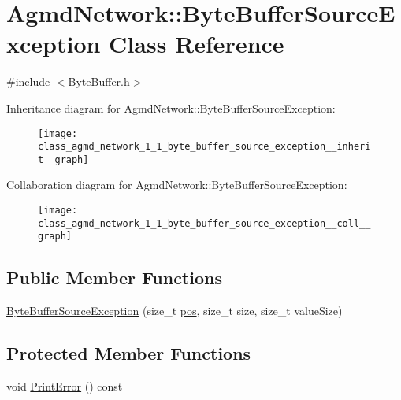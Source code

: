 \hypertarget{class_agmd_network_1_1_byte_buffer_source_exception}{\section{Agmd\+Network\+:\+:Byte\+Buffer\+Source\+Exception Class Reference}
\label{class_agmd_network_1_1_byte_buffer_source_exception}
}


{\ttfamily \#include $<$Byte\+Buffer.\+h$>$}



Inheritance diagram for Agmd\+Network\+:\+:Byte\+Buffer\+Source\+Exception\+:\nopagebreak
\begin{figure}[H]
\begin{center}
\leavevmode
\texttt{[image: class\_agmd\_network\_1\_1\_byte\_buffer\_source\_exception\_\_inherit\_\_graph]}
\end{center}
\end{figure}


Collaboration diagram for Agmd\+Network\+:\+:Byte\+Buffer\+Source\+Exception\+:\nopagebreak
\begin{figure}[H]
\begin{center}
\leavevmode
\texttt{[image: class\_agmd\_network\_1\_1\_byte\_buffer\_source\_exception\_\_coll\_\_graph]}
\end{center}
\end{figure}
\subsection*{Public Member Functions}
\begin{DoxyCompactItemize}
\item 
\hyperlink{class_agmd_network_1_1_byte_buffer_source_exception_a9372cd9ff5a3e72ba4f786a74ff110e3}{Byte\+Buffer\+Source\+Exception} (size\+\_\+t \hyperlink{_examples_2_planet_2_app_8cpp_aa8a1c0491559faca4ebd0881575ae7f0}{pos}, size\+\_\+t size, size\+\_\+t value\+Size)
\end{DoxyCompactItemize}
\subsection*{Protected Member Functions}
\begin{DoxyCompactItemize}
\item 
void \hyperlink{class_agmd_network_1_1_byte_buffer_source_exception_a5f57d0b371a46dce083750bd0656d16f}{Print\+Error} () const 
\end{DoxyCompactItemize}
